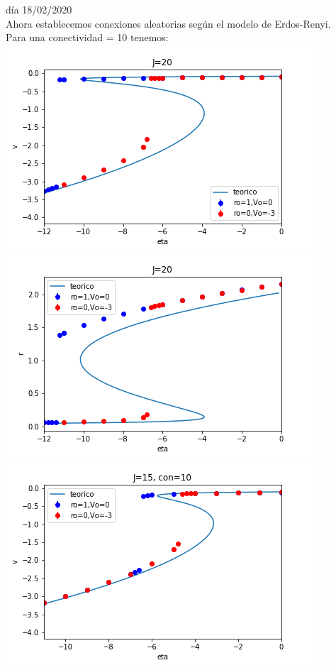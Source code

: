 \documentclass[a4paper]{article}
\begin{document}
día 18/02/2020\\
Ahora establecemos conexiones aleatorias según el modelo de Erdos-Renyi.\\
Para una conectividad = 10 tenemos:\\
\includegraphics[scale=0.7]{v_vs_eta_J20_con10_2.png}\\
\includegraphics[scale=0.7]{r_vs_eta_J20_con10_2.png}\\
\includegraphics[scale=0.7]{v_vs_eta_J15_con10_2.png}\\
\end{document}
